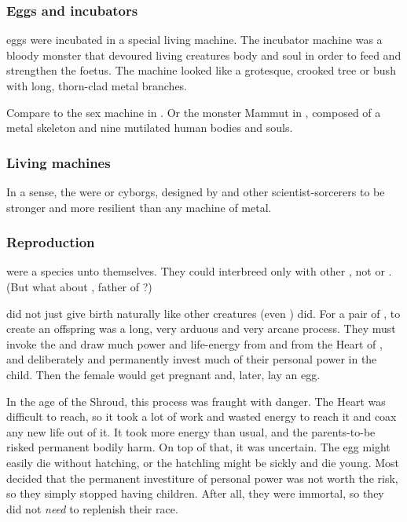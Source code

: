 \subsubsection{Eggs and incubators}
\Draconian eggs were incubated in a special living machine. 
The incubator machine was a bloody monster that devoured living creatures body and soul in order to feed and strengthen the \draconian foetus. 
The machine looked like a grotesque, crooked tree or bush with long, thorn-clad metal branches. 

Compare to the sex machine in \cite{Anime:UrotsukidojiII}. 
Or the monster Mammut in \cite{StevenSavile:CurseoftheNecrarch}, composed of a metal skeleton and nine mutilated human bodies and souls.





\subsubsection{Living machines}
In a sense, the \dragons were  or cyborgs, designed by \Sethicus and other \ophidian scientist-sorcerers to be stronger and more resilient than any machine of metal. 





\subsubsection{Reproduction}
\Dragons were a species unto themselves. 
They could interbreed only with other \dragons, not \quiljaaran or \ophidians.
(But what about \Iurzmacul, father of \Ishnaruchaefir?)

\Dragons did not just give birth naturally like other creatures (even \resphain) did. 
For a pair of \dragons, to create an offspring was a long, very arduous and very arcane process. 
They must invoke the \xss and draw much power and life-energy from \KhothSell and from the Heart of \Miith, and deliberately and permanently invest much of their personal power in the child. 
Then the female would get pregnant and, later, lay an egg. 

In the age of the Shroud, this process was fraught with danger. 
The Heart was difficult to reach, so it took a lot of work and wasted energy to reach it and coax any new life out of it. 
It took more energy than usual, and the \draconic parents-to-be risked permanent bodily harm.
On top of that, it was uncertain. 
The egg might easily die without hatching, or the hatchling might be sickly and die young.
Most \dragons decided that the permanent investiture of personal power was not worth the risk, so they simply stopped having children.
After all, they were immortal, so they did not \emph{need} to replenish their race. 

